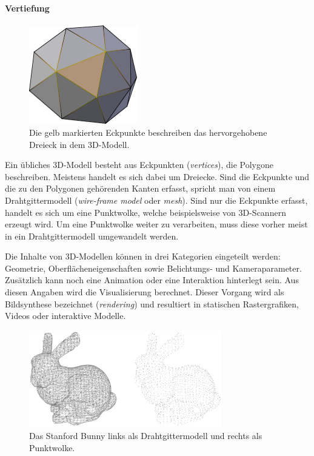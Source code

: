 \paragraph{Vertiefung}
\label{3d:vertiefung}
\begin{figure}
  \begin{center}
    \includegraphics[width=0.42\textwidth]{bilder/3D_VerticesPolygone}
  \end{center}
  \caption{Die gelb markierten Eckpunkte beschreiben das hervorgehobene Dreieck in dem 3D-Modell.}
\end{figure}
Ein übliches 3D-Modell besteht aus Eckpunkten (\emph{vertices}), die Polygone beschreiben. Meistens handelt es sich dabei um Dreiecke. Sind die Eckpunkte und die zu den Polygonen gehörenden Kanten erfasst, spricht man von einem Drahtgittermodell (\emph{wire-frame model} oder \emph{mesh}). Sind nur die Eckpunkte erfasst, handelt es sich um eine Punktwolke, welche beispielsweise von 3D-Scannern erzeugt wird. Um eine Punktwolke weiter zu verarbeiten, muss diese vorher meist in ein Drahtgittermodell umgewandelt werden.

Die Inhalte von 3D-Modellen können in drei Kategorien eingeteilt werden: Geometrie, Oberflächeneigenschaften sowie Belichtungs- und Kameraparameter. Zusätzlich kann noch eine Animation oder eine Interaktion hinterlegt sein. Aus diesen Angaben wird die Visualisierung berechnet. Dieser Vorgang wird als Bildsynthese bezeichnet (\emph{rendering}) und resultiert in statischen Rastergrafiken, Videos oder interaktive Modelle.

\begin{figure}[h!tb]
  \begin{center}
    \includegraphics[width=0.75\textwidth]{bilder/3D_DrahtgitterPunktwolke}
  \end{center}
  \caption{Das Stanford Bunny links als Drahtgittermodell und rechts als Punktwolke.}
\end{figure}

